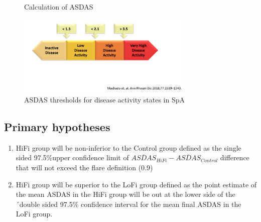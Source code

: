 \documentclass{article}\usepackage[]{graphicx}\usepackage[]{color}
\begin{document}
\begin{figure}
  \centering
  \caption {Calculation of ASDAS}
  \label{fig:asdas}
\end{figure}

\begin{figure}
  \centering
  \includegraphics[width=0.75\textwidth]{asdasactivity.png}
  \caption{ASDAS thresholds for disease activity states in SpA}
  \label{fig:asdasactivity}
\end{figure}

\subsection{Primary hypotheses}

\begin{enumerate}

\item HiFi group will be non-inferior to the Control group defined as the single sided 97.5\%upper confidence limit of  $\overline{ASDAS}_{HiFi} - \overline{ASDAS}_{Control}$ difference that will not exceed the flare definition (0.9)
\item HiFi group will be superior to the LoFi group defined as the point estimate of the mean ASDAS in the HiFi group will be out at the lower side of the ´double sided 97.5\% confidence interval for the mean final ASDAS in the LoFi group.

\end{enumerate}
\end{document}
